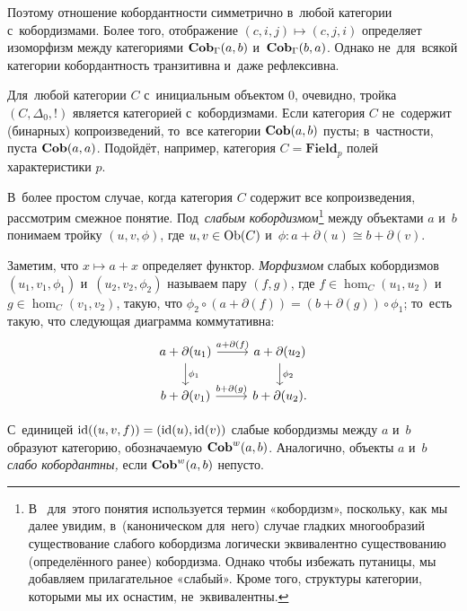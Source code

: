 \documentclass[a4paper,oneside]{article}
\begin{document}
Поэтому отношение кобордантности симметрично в~любой категории с~кобордизмами. Более того, отображение $(c, i, j) \mapsto (c, j, i)$
определяет изоморфизм между категориями $\mathbf{Cob}_\Gamma(a, b)$ и~$\mathbf{Cob}_\Gamma(b, a)$.
Однако не~для~всякой категории кобордантность транзитивна и~даже рефлексивна.

\begin{example*}
  Для~любой категории $C$ с~инициальным объектом $0$, очевидно, тройка $(C, \Delta_0, !)$
  является категорией с~кобордизмами. Если категория $C$ не~содержит (бинарных) копроизведений,
  то~все категории $\mathbf{Cob}(a, b)$ пусты; в~частности, пуста $\mathbf{Cob}(a, a)$.
  Подойдёт, например, категория $C = \mathbf{Field}_p$ полей характеристики $p$.
\end{example*}

В~более простом случае, когда категория $C$ содержит все копроизведения, рассмотрим смежное понятие.
Под~\textit{слабым кобордизмом}\footnote{
  В~\cite{Stong68} для~этого понятия используется термин «кобордизм», поскольку, как мы далее
  увидим, в~(каноническом для~него) случае гладких многообразий существование слабого кобордизма
  логически эквивалентно существованию (определённого ранее) кобордизма. Однако чтобы избежать путаницы,
  мы добавляем прилагательное «слабый». Кроме того, структуры категории, которыми мы их оснастим, не~эквивалентны.
} между объектами $a$ и~$b$
понимаем тройку $(u, v, \phi)$, где $u, v \in \mathrm{Ob}(C)$ и~$\phi : a + \partial(u) \cong b + \partial(v)$.

Заметим, что $x \mapsto a + x$ определяет функтор. \textit{Морфизмом} слабых кобордизмов $(u_1, v_1, \phi_1)$
и~$(u_2, v_2, \phi_2)$ называем пару $(f, g)$, где $f \in \hom_C(u_1, u_2)$ и~$g \in \hom_C(v_1, v_2)$,
такую, что $\phi_2 \circ (a + \partial(f)) = (b + \partial(g)) \circ \phi_1$; то~есть такую, что следующая
диаграмма коммутативна:
\[
  \begin{tikzcd}
    \arrow{d}{\phi_1} a + \partial(u_1) \arrow{r}{a + \partial(f)} & a + \partial(u_2) \arrow{d}{\phi_2} \\
                      b + \partial(v_1) \arrow{r}{b + \partial(g)} & b + \partial(u_2).
  \end{tikzcd}
\]

С~единицей $\mathrm{id}((u, v, f)) = (\mathrm{id}(u), \mathrm{id}(v))$ слабые кобордизмы между $a$ и~$b$ образуют категорию, обозначаемую $\mathbf{Cob}^w(a, b)$.
Аналогично, объекты $a$ и~$b$ \textit{слабо кобордантны,} если $\mathbf{Cob}^w(a, b)$ непусто.
\end{document}
